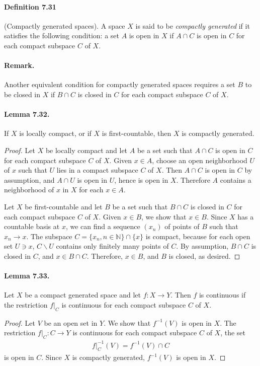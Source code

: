 \documentclass{article}
\numberwithin{equation}{section}
\theoremstyle{plain}
\theoremstyle{definition}
\begin{document}
\paragraph{Definition 7.31\label{def:7.31}} (Compactly generated spaces). A space $X$ is said to be \textit{compactly generated} if it satisfies the following condition: a set $A$ is open in $X$ if $A\cap C$ is open in $C$ for each compact subspace $C$ of $X$.

\paragraph{Remark.} Another equivalent condition for compactly generated spaces requires a set $B$ to be closed in $X$ if $B\cap C$ is closed in $C$ for each compact subspace $C$ of $X$.

\paragraph{Lemma 7.32.\label{lemma:7.32}} If $X$ is locally compact, or if $X$ is first-countable, then $X$ is compactly generated.
\begin{proof}
Let $X$ be locally compact and let $A$ be a set such that $A\cap C$ is open in $C$ for each compact subspace $C$ of $X$. Given $x\in A$, choose an open neighborhood $U$ of $x$ such that $U$ lies in a compact subspace $C$ of $X$. Then $A\cap C$ is open in $C$ by assumption, and $A\cap U$ is open in $U$, hence is open in $X$. Therefore $A$ contains a neighborhood of $x$ in $X$ for each $x\in A$.

Let $X$ be first-countable and let $B$ be a set such that $B\cap C$ is closed in $C$ for each compact subspace $C$ of $X$. Given $x\in B$, we show that $x\in B$. Since $X$ has a countable basis at $x$, we can find a sequence $(x_n)$ of points of $B$ such that $x_n\to x$. The subspace $C=\{x_n,n\in\mathbb{N}\}\cap \{x\}$ is compact, because for each open set $U\ni x$, $C\backslash U$ contains only finitely many points of $C$. By assumption, $B\cap C$ is closed in $C$, and $x\in B\cap C$. Therefore, $x\in B$, and $B$ is closed, as desired.
\end{proof}

\paragraph{Lemma 7.33.\label{lemma:7.33}} Let $X$ be a compact generated space and let $f:X\to Y$. Then $f$ is continuous if the restriction $f|_C$ is continuous for each compact subspace $C$ of $X$.
\begin{proof}
Let $V$ be an open set in $Y$. We show that $f^{-1}(V)$ is open in $X$. The restriction $f|_C:C\to Y$ is continuous for each compact subspace $C$ of $X$, the set
\begin{align*}
	f|_C^{-1}(V)=f^{-1}(V)\cap C
\end{align*}
is open in $C$. Since $X$ is compactly generated, $f^{-1}(V)$ is open in $X$.
\end{proof}
\end{document}
